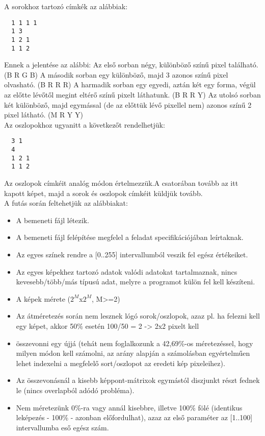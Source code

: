 \documentclass[12pt]{article}
\begin{document}
A sorokhoz tartozó címkék az alábbiak:\\

\begin{verbatim}
  1 1 1 1
  1 3
  1 2 1
  1 1 2
\end{verbatim}

Ennek a jelentése az alábbi: Az első sorban négy, különböző színű pixel található. (B R G B) A második sorban egy különböző, majd 3 azonos színű pixel olvasható. (B R R R) A harmadik sorban egy egyedi, aztán két egy forma, végül az előtte lévőtől megint eltérő színű pixelt láthatunk. (B R R Y) Az utolsó sorban két különböző, majd egymással (de az előttük lévő pixellel nem) azonos színű 2 pixel látható. (M R Y Y) \\

Az oszlopokhoz ugyanitt a következőt rendelhetjük:

\begin{verbatim}
  3 1
  4
  1 2 1
  1 1 2
\end{verbatim}

Az oszlopok címkéit analóg módon értelmezzük.A csatorában tovább az itt kapott képet, majd a sorok és oszlopok címkéit küldjük tovább.
\\

A futás során feltehetjük az alábbiakat:
\begin{itemize}
\item A bemeneti fájl létezik.
\item A bemeneti fájl felépítése megfelel a feladat specifikációjában leírtaknak.
\item Az egyes színek rendre a [0..255] intervallumból veszik fel egész értékeiket.
\item Az egyes képekhez tartozó adatok valódi adatokat tartalmaznak, nincs kevesebb/több/más típusú adat, melyre a programot külön fel kell készíteni.
\item A képek mérete ($2^{M}$x$2^{M}$, M>=2)
\item Az átméretezés során nem lesznek lógó sorok/oszlopok, azaz pl. ha felezni kell egy képet, akkor 50\% esetén 100/50 = 2 -> 2x2 pixelt kell 
\item összevonni egy újjá (tehát nem foglalkozunk a 42,69\%-os méretezéssel, hogy milyen módon kell számolni, az arány alapján a számolásban egyértelműen lehet indexelni a megfelelő sort/oszlopot az eredeti kép pixeleihez).
\item Az összevonásnál a kisebb képpont-mátrixok egymástól diszjunkt részt fednek le (nincs overlapból adódó probléma).
\item Nem méretezünk 0\%-ra vagy annál kisebbre, illetve 100\% fölé (identikus leképezés - 100\% - azonban előfordulhat), azaz az első paraméter az [1..100] intervallumba eső egész szám.
\end{itemize}
\end{document}
